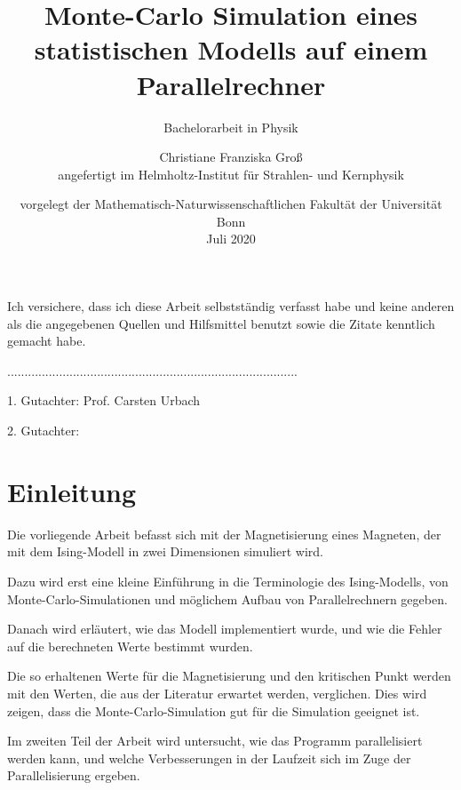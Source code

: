 \documentclass{scrreprt}
\title{Monte-Carlo Simulation eines statistischen Modells auf einem Parallelrechner}
\subtitle{Bachelorarbeit in Physik}
\date{vorgelegt der Mathematisch-Naturwissenschaftlichen Fakultät der Universität Bonn \\ Juli 2020}
\author{Christiane Franziska Groß\\ angefertigt im Helmholtz-Institut für Strahlen- und Kernphysik}
\begin{document}
	\maketitle
	
	
	Ich versichere, dass ich diese Arbeit selbstständig verfasst habe und keine anderen als die angegebenen Quellen und Hilfsmittel benutzt sowie die Zitate kenntlich gemacht habe.

	\vspace{2cm}
	
	....................................................................................
	
	\vspace{5cm}	
	
	1. Gutachter: Prof. Carsten Urbach
	
	2. Gutachter: 
	
	\newpage
	
	\tableofcontents
	
	\clearpage
	
	
	\section*{Einleitung}
	
	
	Die vorliegende Arbeit befasst sich mit der Magnetisierung eines Magneten, der mit dem Ising-Modell in zwei Dimensionen simuliert wird. 
	
	Dazu wird erst eine kleine Einführung in die Terminologie des Ising-Modells, von Monte-Carlo-Simulationen und möglichem Aufbau von Parallelrechnern gegeben.
	
	Danach wird erläutert, wie das Modell implementiert wurde, und wie die Fehler auf die berechneten Werte bestimmt wurden.
	
	Die so erhaltenen Werte für die Magnetisierung und den kritischen Punkt werden mit den Werten, die aus der Literatur erwartet werden, verglichen. Dies wird zeigen, dass die Monte-Carlo-Simulation gut für die Simulation geeignet ist.
	
	Im zweiten Teil der Arbeit wird untersucht, wie das Programm parallelisiert werden kann, und welche Verbesserungen in der Laufzeit sich im Zuge der Parallelisierung ergeben.
	
\end{document}
